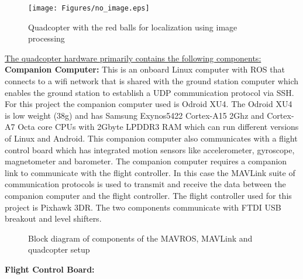 \documentclass{article}
\begin{document}
\begin{figure}[H]
\centering
\texttt{[image: Figures/no\_image.eps]}
\caption{Quadcopter with the red balls for localization using image processing}
\label{quad_red_balls}
\end{figure}


\underline{The quadcopter hardware primarily contains the following components:}\\
\textbf{Companion Computer:} This is an onboard Linux computer with ROS that connects to a wifi network that is shared with the ground station computer which enables the ground station to establish a UDP communication protocol via SSH. For this project the companion computer used is Odroid XU4. The Odroid XU4 is low weight (38g) and has Samsung Exynos5422 Cortex-A15 2Ghz and Cortex-A7 Octa core CPUs with 2Gbyte LPDDR3 RAM which can run different versions of Linux and Android. This companion computer also communicates with a flight control board which has integrated motion sensors like accelerometer, gyroscope, magnetometer and barometer. The companion computer requires a companion link to communicate with the flight controller. In this case the MAVLink suite of communication protocols is used to transmit and receive the data between the companion computer and the flight controller. The flight controller used for this project is Pixhawk 3DR. The two components communicate with FTDI USB breakout and level shifters. 
\begin{figure}
\centering

\caption{Block diagram of components of the MAVROS, MAVLink and quadcopter setup}
\label{offboard_control_ros_EPS}
\end{figure}
\textbf{Flight Control Board:} 
\end{document}

